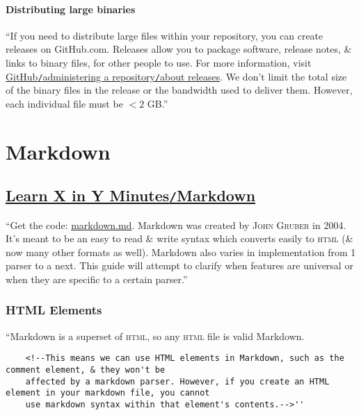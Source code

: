 \documentclass[oneside]{book}
\numberwithin{equation}{section}
\begin{document}
\subsubsection{Distributing large binaries}
``If you need to distribute large files within your repository, you can create releases on GitHub.com. Releases allow you to package software, release notes, \& links to binary files, for other people to use. For more information, visit \href{https://docs.github.com/en/github/administering-a-repository/about-releases}{GitHub\texttt{/}administering a repository\texttt{/}about releases}. We don't limit the total size of the binary files in the release or the bandwidth used to deliver them. However, each individual file must be $< 2$ GB.''


\chapter{Markdown}

\section{\href{https://learnxinyminutes.com/docs/markdown/}{Learn X in Y Minutes\texttt{/}Markdown}}
``Get the code: \href{https://learnxinyminutes.com/docs/files/markdown.md}{markdown.md}. Markdown was created by \textsc{John Gruber} in 2004. It's meant to be an easy to read \& write syntax which converts easily to \textsc{html} (\& now many other formats as well). Markdown also varies in implementation from 1 parser to a next. This guide will attempt to clarify when features are universal or when they are specific to a certain parser.''

\subsection{HTML Elements}
``Markdown is a superset of \textsc{html}, so any \textsc{html} file is valid Markdown.
\begin{verbatim}
	<!--This means we can use HTML elements in Markdown, such as the comment element, & they won't be
	affected by a markdown parser. However, if you create an HTML element in your markdown file, you cannot
	use markdown syntax within that element's contents.-->''
\end{verbatim}
\end{document}
